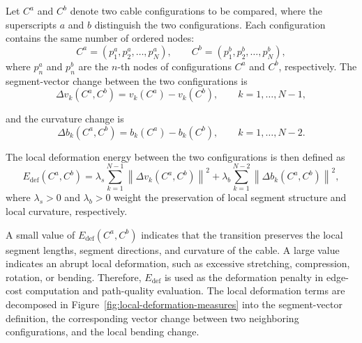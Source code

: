 \documentclass{pas}
\begin{document}
Let \(C^a\) and \(C^b\) denote two cable configurations to be compared, where
the superscripts \(a\) and \(b\) distinguish the two configurations. Each configuration contains the same number of ordered nodes:
\begin{equation}
C^a=(p^a_1,p^a_2,\ldots,p^a_N),
\qquad
C^b=(p^b_1,p^b_2,\ldots,p^b_N),
\end{equation}
where \(p^a_n\) and \(p^b_n\) are the \(n\)-th nodes of configurations \(C^a\)
and \(C^b\), respectively.
The segment-vector change between the two configurations is
\begin{equation}
\Delta v_k(C^a,C^b)
=
v_k(C^a)-v_k(C^b),
\qquad
k=1,\ldots,N-1,
\label{eq:gcr_segment_vector_change}
\end{equation}

and the curvature change is
\begin{equation}
\Delta b_k(C^a,C^b)
=
b_k(C^a)-b_k(C^b),
\qquad
k=1,\ldots,N-2.
\label{eq:gcr_curvature_change}
\end{equation}

The local deformation energy between the two configurations is then defined as
\begin{equation}
E_{\mathrm{def}}(C^a,C^b)
=
\lambda_s
\sum_{k=1}^{N-1}
\left\|
\Delta v_k(C^a,C^b)
\right\|^2
+
\lambda_b
\sum_{k=1}^{N-2}
\left\|
\Delta b_k(C^a,C^b)
\right\|^2,
\label{eq:gcr_transition_deformation_energy}
\end{equation}
where \(\lambda_s>0\) and \(\lambda_b>0\) weight the preservation of local
segment structure and local curvature, respectively.

A small value of \(E_{\mathrm{def}}(C^a,C^b)\) indicates that the transition
preserves the local segment lengths, segment directions, and curvature of the
cable. A large value indicates an abrupt local deformation, such as excessive
stretching, compression, rotation, or bending. Therefore, \(E_{\mathrm{def}}\)
is used as the deformation penalty in edge-cost computation and path-quality
evaluation.
The local deformation terms are decomposed in
Figure~\ref{fig:local-deformation-measures} into the segment-vector definition,
the corresponding vector change between two neighboring configurations, and the local bending
change.
\end{document}
